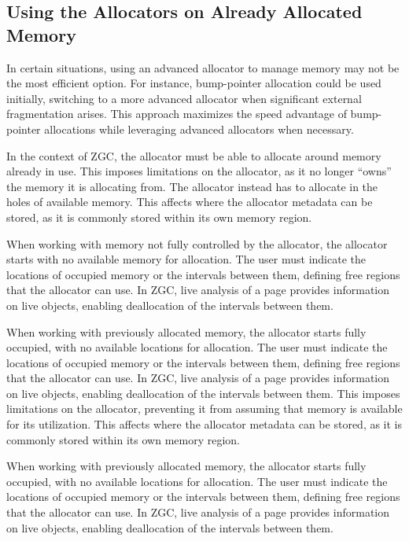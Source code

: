 \subsection{Using the Allocators on Already Allocated Memory} \label{sec:freerangeexpl}
In certain situations, using an advanced allocator to manage memory may not be the most efficient option. For instance, bump-pointer allocation could be used initially, switching to a more advanced allocator when significant external fragmentation arises. This approach maximizes the speed advantage of bump-pointer allocations while leveraging advanced allocators when necessary.

In the context of ZGC, the allocator must be able to allocate around memory already in use. This imposes limitations on the allocator, as it no longer ``owns'' the memory it is allocating from. The allocator instead has to allocate in the holes of available memory. This affects where the allocator metadata can be stored, as it is commonly stored within its own memory region.

When working with memory not fully controlled by the allocator, the allocator starts with no available memory for allocation. The user must indicate the locations of occupied memory or the intervals between them, defining free regions that the allocator can use. In ZGC, live analysis of a page provides information on live objects, enabling deallocation of the intervals between them.

When working with previously allocated memory, the allocator starts fully occupied, with no available locations for allocation. The user must indicate the locations of occupied memory or the intervals between them, defining free regions that the allocator can use. In ZGC, live analysis of a page provides information on live objects, enabling deallocation of the intervals between them.
This imposes limitations on the allocator, preventing it from assuming that memory is available for its utilization. This affects where the allocator metadata can be stored, as it is commonly stored within its own memory region.

When working with previously allocated memory, the allocator starts fully occupied, with no available locations for allocation. The user must indicate the locations of occupied memory or the intervals between them, defining free regions that the allocator can use. In ZGC, live analysis of a page provides information on live objects, enabling deallocation of the intervals between them.

